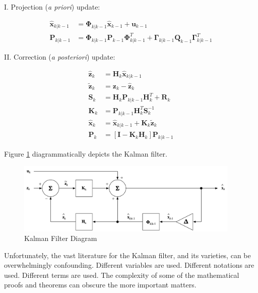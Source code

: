 I. Projection (\textit{a priori}) update:

\begin{equation*}
    \begin{aligned}
        \hat{\mathbf{x}}_{k|k-1} &= \mathbf{\Phi}_{k|k-1} \hat{\mathbf{x}}_{k-1} + \mathbf{u}_{k-1} \\
        \mathbf{P}_{k|k-1} &= \mathbf{\Phi}_{k|k-1} \mathbf{P}_{k-1} \mathbf{\Phi}_{k|k-1}^T + \mathbf{\Gamma}_{k|k-1} \mathbf{Q}_{k-1} \mathbf{\Gamma}_{k|k-1}^T
    \end{aligned}
\end{equation*}

II. Correction (\textit{a posteriori}) update:

\begin{equation*}
    \begin{aligned}
        \hat{\mathbf{z}}_k &= \mathbf{H}_k \hat{\mathbf{x}}_{k|k-1} \\
        \tilde{\mathbf{z}}_k &= \mathbf{z}_k - \hat{\mathbf{z}}_k \\
        \mathbf{S}_k &= \mathbf{H}_k \mathbf{P}_{k|k-1} \mathbf{H}_k^T + \mathbf{R}_k \\
        \mathbf{K}_k &= \mathbf{P}_{k|k-1} \mathbf{H}_{k}^T \mathbf{S}_k^{-1} \\
        \hat{\mathbf{x}}_k &= \hat{\mathbf{x}}_{k|k-1} +\mathbf{K}_k \tilde{\mathbf{z}}_k \\
        \mathbf{P}_k &= \left[ \mathbf{I} - \mathbf{K}_k \mathbf{H}_k \right] \mathbf{P}_{k|k-1}
    \end{aligned}
\end{equation*}

Figure \ref{fig:kf-diagram} diagrammatically depicts the Kalman filter.

\begin{figure}[ht]
    \centering
    \includegraphics[width=0.95\textwidth]{images/KF-Diagram.png}
    \caption{Kalman Filter Diagram}
    \label{fig:kf-diagram}
\end{figure}

Unfortunately, the vast literature for the Kalman filter, and its varieties, can be
overwhelmingly confounding. Different variables are used. Different notations are used.
Different terms are used. The complexity of some of the mathematical proofs and theorems
can obscure the more important matters.

